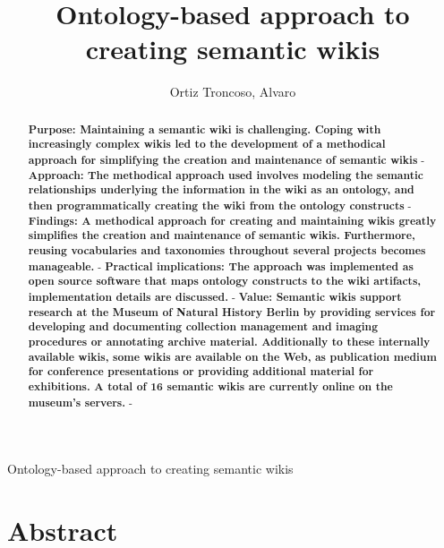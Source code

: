 \documentclass{ijcs_template}
\begin{document}
%
%

{Ontology-based approach to creating semantic wikis}

\title{Ontology-based approach to creating semantic wikis}

\author{Ortiz Troncoso, Alvaro}

\address{Museum f\"ur Naturkunde - Leibniz Institute for Research on Evolution and Biodiversity, Invalidenstrasse 43, 10115 Berlin, Germany 
}

\maketitle

\begin{history}
\end{history}

\section*{Abstract}
\begin{abstract}
\newline\textbf{Purpose: Maintaining a semantic wiki is challenging. Coping with increasingly complex wikis led to the development of a methodical approach for simplifying the creation and maintenance of semantic wikis} - 
\newline\textbf{Approach: The methodical approach used involves modeling the semantic relationships underlying the information in the wiki as an ontology, and then programmatically creating the wiki from the ontology constructs} - 
\newline\textbf{Findings: A methodical approach for creating and maintaining wikis greatly simplifies the creation and maintenance of semantic wikis. Furthermore, reusing vocabularies and taxonomies throughout several projects becomes manageable.} - 
\newline\textbf{Practical implications: The approach was implemented as open source software that maps ontology constructs to the wiki artifacts, implementation details are discussed.} - 
\newline\textbf{Value: Semantic wikis support research at the Museum of Natural History Berlin by providing services for developing and documenting collection management and imaging procedures or annotating archive material. Additionally to these internally available wikis, some wikis are available on the Web, as publication medium for conference presentations or providing additional material for exhibitions. A total of 16 semantic wikis are currently online on the museum's servers.} -

\end{abstract}
\end{document}
